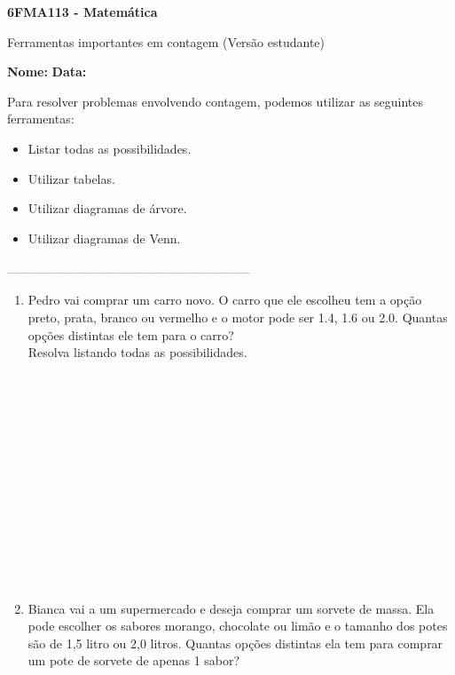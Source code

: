 \documentclass[a4paper,14pt]{article}
\begin{document}
	
	\noindent\textbf{6FMA113 - Matemática} 
	
	\begin{center}Ferramentas importantes em contagem (Versão estudante)
	\end{center}
	
	\noindent\textbf{Nome:} \underline{\hspace{10cm}}
	\noindent\textbf{Data:} \underline{\hspace{4cm}}
	
	
	\begin{multicols}{2}
		\noindent Para resolver problemas envolvendo contagem, podemos utilizar as seguintes ferramentas: \begin{itemize} 
		\item Listar todas as possibilidades.
		\item Utilizar tabelas.
		\item Utilizar diagramas de árvore.
		\item Utilizar diagramas de Venn.
		\end{itemize}
		\noindent\textsubscript{-----------------------------------------------------------------------}
		\begin{enumerate} 
			\item Pedro vai comprar um carro novo. O carro que ele escolheu tem a opção preto, prata, branco ou vermelho e o motor pode ser 1.4, 1.6 ou 2.0. Quantas opções distintas ele tem para o carro? \\
			Resolva listando todas as possibilidades. \\\\\\\\\\\\\\\\\\\\\\\\\\\\
			\item Bianca vai a um supermercado e deseja comprar um sorvete de massa. Ela pode escolher os sabores morango, chocolate ou limão e o tamanho dos potes são de 1,5 litro ou 2,0 litros. Quantas opções distintas ela tem para comprar um pote de sorvete de apenas 1 sabor? \\

\end{enumerate}
\end{multicols}
\end{document}
